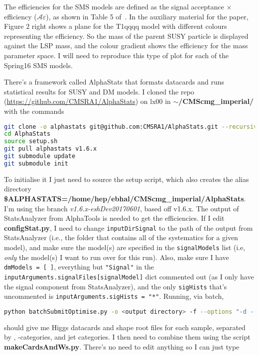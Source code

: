 The efficiencies for the SMS models are defined as the signal acceptance $\times$ efficiency ($\mathcal{A} \varepsilon$), as shown in Table 5 of~\cite{CMS-PAPER-SUS-15-005-arXiv}. In the auxiliary material for the paper, Figure 2 right shows a plane for the T1qqqq model with different colours representing the efficiency. So the mass of the parent SUSY particle is displayed against the LSP mass, and the colour gradient shows the efficiency for the mass parameter space. I will need to reproduce this type of plot for each of the Spring16 SMS models.

There's a framework called AlphaStats that formats datacards and runs statistical results for SUSY and DM models. I cloned the repo (\url{https://github.com/CMSRA1/AlphaStats}) on lx00 in \textbf{$\sim$/CMScmg\_imperial/} with the commands

\begin{lstlisting}[belowskip=-0.7cm, language=sh, numbers=none]
git clone -o alphastats git@github.com:CMSRA1/AlphaStats.git --recursive
cd AlphaStats
source setup.sh 
git pull alphastats v1.6.x
git submodule update
git submodule init
\end{lstlisting}

To initialise it I just need to source the setup script, which also creates the alias directory \textbf{\$ALPHASTATS=/home/hep/ebhal/CMScmg\_imperial/AlphaStats}. I'm using the branch \emph{v1.6.x-eshDev20170601}, based off v1.6.x. The output of StatsAnalyzer from AlphaTools is needed to get the efficiencies. If I edit \textbf{configStat.py}, I need to change \verb!inputDirSignal! to the path of the output from StatsAnalyzer (i.e., the folder that contains all of the systematics for a given model), and make sure the model(s) are specified in the \verb!signalModels! list (i.e, \emph{only} the model(s) I want to run over for this run). Also, make sure I have \texttt{dmModels = [ ]}, everything but \verb!"Signal"! in the \texttt{inputArguments.signalFiles[signalModel]} dict commented out (as I only have the signal component from StatsAnalyzer), and the only \texttt{sigHists} that's uncommented is \texttt{inputArguments.sigHists = "*"}. Running, via batch,

\begin{lstlisting}[belowskip=-0.7cm, language=sh, numbers=none]
python batchSubmitOptimise.py -o <output directory> -f --options "-d --getDataLumi --greenBand --signalMCStat" --submit
\end{lstlisting}

should give me Higgs datacards and shape root files for each sample, separated by \HT, \Pqb-categories, and jet categories. I then need to combine them using the script \textbf{makeCardsAndWs.py}. There's no need to edit anything so I can just type

